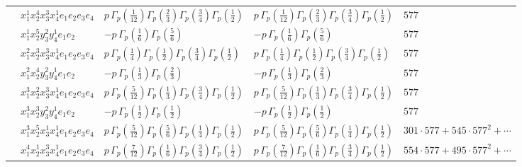\documentclass[11pt]{article}
\begin{document}
\begin{table}[ht]
{\begin{tabular}{@{}lllll@{}}
 & $x_{1}^{1} x_{2}^{4} x_{3}^{3} x_{4}^{1}  e_{1} e_{2} e_{3} e_{4}$ & $p \, \Gamma_p \left( \frac{1}{12} \right) \Gamma_p \left( \frac{2}{3} \right) \Gamma_p \left( \frac{3}{4} \right) \Gamma_p \left( \frac{1}{2} \right)$ & $p \, \Gamma_p \left( \frac{1}{12} \right) \Gamma_p \left( \frac{2}{3} \right) \Gamma_p \left( \frac{3}{4} \right) \Gamma_p \left( \frac{1}{2} \right)$ & $577$ \\
 & $x_{1}^{1} x_{2}^{5} y_{3}^{2} y_{4}^{1} e_{1} e_{2}$ & $- p \, \Gamma_p \left( \frac{1}{6} \right) \Gamma_p \left( \frac{5}{6} \right)$ & $- p \, \Gamma_p \left( \frac{1}{6} \right) \Gamma_p \left( \frac{5}{6} \right)$ & $577$ \\
 & $x_{1}^{2} x_{2}^{3} x_{3}^{3} x_{4}^{1}  e_{1} e_{2} e_{3} e_{4}$ & $p \, \Gamma_p \left( \frac{1}{4} \right) \Gamma_p \left( \frac{1}{2} \right) \Gamma_p \left( \frac{3}{4} \right) \Gamma_p \left( \frac{1}{2} \right)$ & $p \, \Gamma_p \left( \frac{1}{4} \right) \Gamma_p \left( \frac{1}{2} \right) \Gamma_p \left( \frac{3}{4} \right) \Gamma_p \left( \frac{1}{2} \right)$ & $577$ \\
 & $x_{1}^{2} x_{2}^{4} y_{3}^{2} y_{4}^{1} e_{1} e_{2}$ & $- p \, \Gamma_p \left( \frac{1}{3} \right) \Gamma_p \left( \frac{2}{3} \right)$ & $- p \, \Gamma_p \left( \frac{1}{3} \right) \Gamma_p \left( \frac{2}{3} \right)$ & $577$ \\
 & $x_{1}^{3} x_{2}^{2} x_{3}^{3} x_{4}^{1}  e_{1} e_{2} e_{3} e_{4}$ & $p \, \Gamma_p \left( \frac{5}{12} \right) \Gamma_p \left( \frac{1}{3} \right) \Gamma_p \left( \frac{3}{4} \right) \Gamma_p \left( \frac{1}{2} \right)$ & $p \, \Gamma_p \left( \frac{5}{12} \right) \Gamma_p \left( \frac{1}{3} \right) \Gamma_p \left( \frac{3}{4} \right) \Gamma_p \left( \frac{1}{2} \right)$ & $577$ \\
 & $x_{1}^{3} x_{2}^{3} y_{3}^{2} y_{4}^{1} e_{1} e_{2}$ & $- p \, \Gamma_p \left( \frac{1}{2} \right) \Gamma_p \left( \frac{1}{2} \right)$ & $- p \, \Gamma_p \left( \frac{1}{2} \right) \Gamma_p \left( \frac{1}{2} \right)$ & $577$ \\
 & $x_{1}^{3} x_{2}^{5} x_{3}^{1} x_{4}^{1}  e_{1} e_{2} e_{3} e_{4}$ & $p \, \Gamma_p \left( \frac{5}{12} \right) \Gamma_p \left( \frac{5}{6} \right) \Gamma_p \left( \frac{1}{4} \right) \Gamma_p \left( \frac{1}{2} \right)$ & $p \, \Gamma_p \left( \frac{5}{12} \right) \Gamma_p \left( \frac{5}{6} \right) \Gamma_p \left( \frac{1}{4} \right) \Gamma_p \left( \frac{1}{2} \right)$ & $301{\cdot}577{+}545{\cdot}577^{2}{+}\cdots$ \\
 & $x_{1}^{4} x_{2}^{1} x_{3}^{3} x_{4}^{1}  e_{1} e_{2} e_{3} e_{4}$ & $p \, \Gamma_p \left( \frac{7}{12} \right) \Gamma_p \left( \frac{1}{6} \right) \Gamma_p \left( \frac{3}{4} \right) \Gamma_p \left( \frac{1}{2} \right)$ & $p \, \Gamma_p \left( \frac{7}{12} \right) \Gamma_p \left( \frac{1}{6} \right) \Gamma_p \left( \frac{3}{4} \right) \Gamma_p \left( \frac{1}{2} \right)$ & $554{\cdot}577{+}495{\cdot}577^{2}{+}\cdots$ \\

\end{tabular}}
\end{table}
\end{document}
